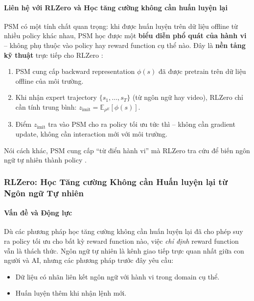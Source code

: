 \paragraph{Liên hệ với RLZero và Học tăng cường không cần huấn luyện lại}

PSM có một tính chất quan trọng: khi được huấn luyện trên dữ liệu
offline từ nhiều policy khác nhau, PSM học được một \textbf{biểu diễn
phổ quát của hành vi} -- không phụ thuộc vào policy hay reward function
cụ thể nào. Đây là \textbf{nền tảng kỹ thuật} trực tiếp cho
RLZero \cite{sikchi2025rlzero}:

\begin{enumerate}
    \item PSM cung cấp backward representation $\phi(s)$ đã được
    pretrain trên dữ liệu offline của môi trường.
    \item Khi nhận expert trajectory $\{s_1, \ldots, s_T\}$ (từ
    ngôn ngữ hay video), RLZero chỉ cần tính trung bình:
    $z_{\text{imit}} = \mathbb{E}_{\rho^E}[\phi(s)]$.
    \item Điểm $z_{\text{imit}}$ tra vào PSM cho ra policy tối
    ưu tức thì -- không cần gradient update, không cần interaction
    mới với môi trường.
\end{enumerate}

Nói cách khác, PSM cung cấp ``từ điển hành vi'' mà RLZero tra cứu để
biến ngôn ngữ tự nhiên thành policy \cite{eysenbach2025generativerl}.

\subsubsection{RLZero: Học Tăng cường Không cần Huấn luyện lại từ Ngôn ngữ Tự nhiên}

\paragraph{Vấn đề và Động lực}

Dù các phương pháp học tăng cường không cần huấn luyện lại đã cho phép suy ra policy tối ưu cho
bất kỳ reward function nào, việc \textit{chỉ định} reward function vẫn
là thách thức. Ngôn ngữ tự nhiên là kênh giao tiếp trực quan nhất
giữa con người và AI, nhưng các phương pháp trước đây yêu cầu:
\begin{itemize}
    \item Dữ liệu có nhãn liên kết ngôn ngữ với hành vi trong domain
    cụ thể.
    \item Huấn luyện thêm khi nhận lệnh mới.
\end{itemize}

